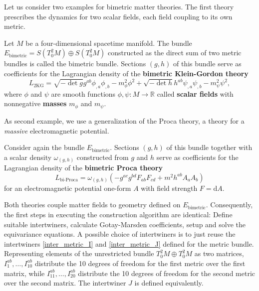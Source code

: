 Let us consider two examples for bimetric matter theories. The first theory prescribes the dynamics for two scalar fields, each field coupling to its own metric.
\begin{definition}
  Let $M$ be a four-dimensional spacetime manifold. The bundle $E_\text{bimetric} = S(T^2_0M) \oplus S(T^2_0M)$ constructed as the direct sum of two metric bundles is called the bimetric bundle. Sections $(g,h)$ of this bundle serve as coefficients for the Lagrangian density of the \textbf{bimetric Klein-Gordon theory}
  \begin{equation}
    L_\text{2KG} = \sqrt{-\operatorname{det}g}g^{ab} \phi_{,a}\phi_{,b} - m_\phi^2 \phi^2 + \sqrt{-\operatorname{det}h}h^{ab} \psi_{,a}\psi_{,b} - m_\psi^2 \psi^2,
  \end{equation}
  where $\phi$ and $\psi$ are smooth functions $\phi,\psi\colon M\rightarrow \mathbb R$ called \textbf{scalar fields} with nonnegative \textbf{masses} $m_\phi$ and $m_\psi$.
\end{definition}
As second example, we use a generalization of the Proca theory, a theory for a \emph{massive} electromagnetic potential.
\begin{definition}
  Consider again the bundle $E_\text{bimetric}$. Sections $(g,h)$ of this bundle together with a scalar density $\omega_{(g,h)}$ constructed from $g$ and $h$ serve as coefficients for the Lagrangian density of the \textbf{bimetric Proca theory}
  \begin{equation}
    L_\text{bi-Proca} = \omega_{(g,h)}\left( -g^{ac} g^{bd} F_{ab} F_{cd} + m^2 h^{ab} A_a A_b \right)
  \end{equation}
  for an electromagnetic potential one-form $A$ with field strength $F=\mathrm dA$.
\end{definition}

Both theories couple matter fields to geometry defined on $E_\text{bimetric}$. Consequently, the first steps in executing the construction algorithm are identical: Define suitable intertwiners, calculate Gotay-Marsden coefficients, setup and solve the equivariance equations. A possible choice of intertwiners is to just reuse the intertwiners \eqref{inter_metric_I} and \eqref{inter_metric_J} defined for the metric bundle. Representing elements of the unrestricted bundle $T^2_0M\oplus T^2_0M$ as two matrices, $I_1^{ab},\dots,I_{10}^{ab}$ distribute the 10 degrees of freedom for the first metric over the first matrix, while $I_{11}^{ab},\dots,I_{20}^{ab}$ distribute the 10 degrees of freedom for the second metric over the second matrix. The intertwiner $J$ is defined equivalently.

